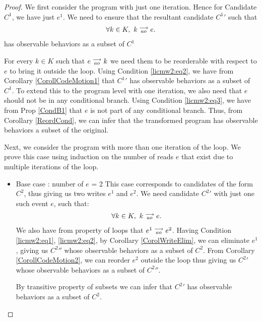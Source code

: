 \begin{proof}

    We first consider the program with just one iteration. 
    Hence for Candidate $C^1$, we have just $e^1$. 
    We need to ensure that the resultant candidate $C^{1}'$ such that 
    \begin{align*}
        \forall k \in K, \ k\stackrel{\longrightarrow}{_{ao}}e.
    \end{align*}  
    has observable behaviors as a subset of $C^1$

    For every $k \in K$ such that $e\stackrel{\longrightarrow}{_{ao}}k$ we need them to be reorderable with respect to $e$ to bring it outside the loop.
    Using Condition \ref{licmw2:eq2}, we have from Corollary \ref{CorollCodeMotion1} that $C^{1}'$ has observable behaviors as a subset of $C^1$.
    To extend this to the program level with one iteration, we also need that $e$ should not be in any conditional branch.
    Using Condition \ref{licmw2:eq3}, we have from Prop \ref{CondB1} that $e$ is not part of any conditional branch.
    Thus, from Corollary \ref{ReordCond}, we can infer that the transformed program has observable behaviors a subset of the original.   
    
    Next, we consider the program with more than one iteration of the loop. 
    We prove this case using induction on the number of reads $e$ that exist due to multiple iterations of the loop. 

    \begin{itemize}

        \item Base case : number of $e$ = 2
        This case corresponds to candidates of the form $C^2$, thus giving us two writes $e^1$ and $e^2$.
        We need candidate $C^{2}'$ with just one such event $e$, such that:
        \begin{align*}
            \forall k \in K, \ k\stackrel{\longrightarrow}{_{ao}}e.
        \end{align*}  
        We also have from property of loops that $e^1\stackrel{\longrightarrow}{_{ao}}e^2$.
        Having Condition \ref{licmw2:eq1}, \ref{licmw2:eq2}, by Corollary \ref{CorolWriteElim}, we can eliminate $e^1$, giving us $C^{2}''$ whose observable behaviors as a subset of $C^2$.  
        From Corollary \ref{CorollCodeMotion2}, we can reorder $e^2$ outside the loop thus giving us $C^{2}'$ whose observable behaviors as a subset of $C^{2}''$.
        
        By transitive property of subsets we can infer that $C^{2}'$ has observable behaviors as a subset of $C^2$.
        

\end{itemize}
\end{proof}
